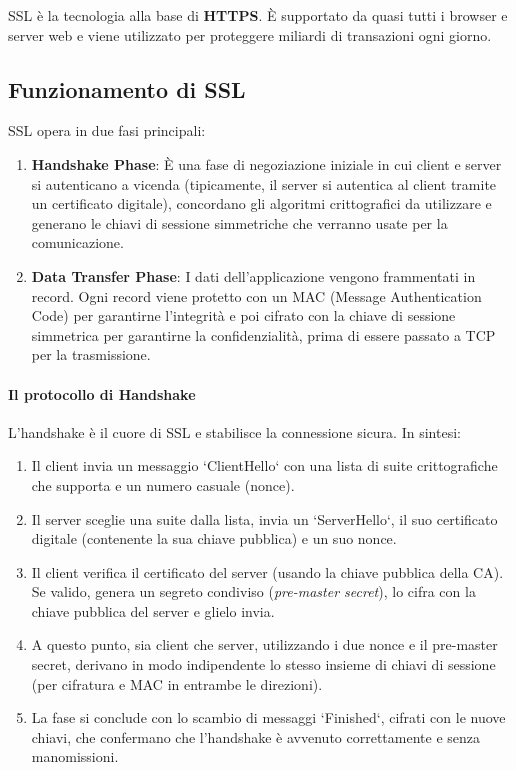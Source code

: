 
SSL è la tecnologia alla base di \textbf{HTTPS}. È supportato da quasi tutti i browser e server web e viene utilizzato per proteggere miliardi di transazioni ogni giorno.

\subsection{Funzionamento di SSL}
SSL opera in due fasi principali:
\begin{enumerate}
    \item \textbf{Handshake Phase}: È una fase di negoziazione iniziale in cui client e server si autenticano a vicenda (tipicamente, il server si autentica al client tramite un certificato digitale), concordano gli algoritmi crittografici da utilizzare e generano le chiavi di sessione simmetriche che verranno usate per la comunicazione.
    \item \textbf{Data Transfer Phase}: I dati dell'applicazione vengono frammentati in record. Ogni record viene protetto con un MAC (Message Authentication Code) per garantirne l'integrità e poi cifrato con la chiave di sessione simmetrica per garantirne la confidenzialità, prima di essere passato a TCP per la trasmissione.
\end{enumerate}

\paragraph{Il protocollo di Handshake}
L'handshake è il cuore di SSL e stabilisce la connessione sicura. In sintesi:
\begin{enumerate}
    \item Il client invia un messaggio `ClientHello` con una lista di suite crittografiche che supporta e un numero casuale (nonce).
    \item Il server sceglie una suite dalla lista, invia un `ServerHello`, il suo certificato digitale (contenente la sua chiave pubblica) e un suo nonce.
    \item Il client verifica il certificato del server (usando la chiave pubblica della CA). Se valido, genera un segreto condiviso (\textit{pre-master secret}), lo cifra con la chiave pubblica del server e glielo invia.
    \item A questo punto, sia client che server, utilizzando i due nonce e il pre-master secret, derivano in modo indipendente lo stesso insieme di chiavi di sessione (per cifratura e MAC in entrambe le direzioni).
    \item La fase si conclude con lo scambio di messaggi `Finished`, cifrati con le nuove chiavi, che confermano che l'handshake è avvenuto correttamente e senza manomissioni.
\end{enumerate}

